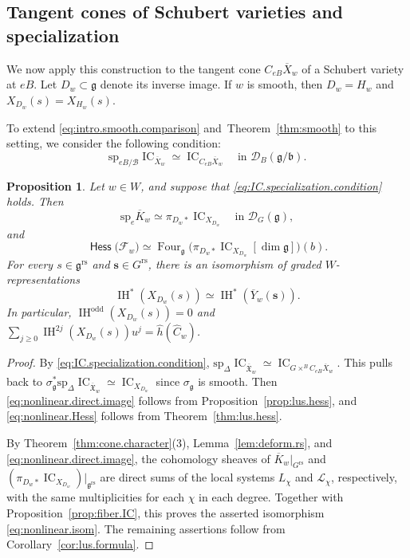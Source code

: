 \documentclass[11pt]{amsart}
\numberwithin{equation}{section}
\newtheorem{proposition}[theorem]{Proposition}
\theoremstyle{definition}
\newcommand\grs{\mathfrak{g}^{\mathrm{rs}}}
\def\beq{\begin{equation}}
\def\eeq{\end{equation}}
\def\sp{\mathrm{sp}}
\DeclareMathOperator{\IC}{\mathrm{IC}}
\DeclareMathOperator{\Four}{Four}
\def\cB{\mathcal {B}}
\DeclareMathOperator{\Hess}{\mathsf{Hess}}
\def\fg{\mathfrak {g}}
\def\fb{\mathfrak {b}}
\def\fX{\mathfrak {X}}
\def\Grs{G^{\mathrm{rs}}}
\DeclareMathOperator{\IH}{\mathrm{IH}}
\begin{document}
\subsection{Tangent cones of Schubert varieties and specialization}
\label{ss:nonlinear.specialization}

We now apply this construction to the tangent cone $C_{eB}\overline X_w$ of a Schubert variety at $eB$. Let $D_w\subset \fg $ denote its inverse image. If $w$ is smooth, then $D_w=H_w$ and $X_{D_w}(s)=X_{H_w}(s)$.

To extend \eqref{eq:intro.smooth.comparison} and~Theorem~\ref{thm:smooth} to this setting, we consider the following condition:
\begin{equation}\tag{SP}\label{eq:IC.specialization.condition}
\sp_{eB/\cB}\IC_{\overline X_w}\simeq\IC_{C_{eB}\overline X_w}
\quad\text{in }\mathscr D_B(\fg/\fb).
\end{equation}


\begin{proposition}\label{prop:nonlinear.specialization}
Let $w\in W$, and suppose that \eqref{eq:IC.specialization.condition} holds. Then
\beq\label{eq:nonlinear.direct.image}
\sp_e\overline K_w\simeq \pi_{D_w*}\IC_{X_{D_w}}\quad\text{in }\mathscr D_G(\fg),
\eeq
and
\beq\label{eq:nonlinear.Hess}
\Hess\big(\mathcal F_w\big)\simeq\Four_\fg\big(\pi_{D_w*}\IC_{X_{D_w}}[\dim \fg]\big)(b).
\eeq
For every $s\in\grs$ and $\mathbf s\in\Grs$, there is
an isomorphism of graded $W$-representations
\beq\label{eq:nonlinear.isom}
\IH^*(X_{D_w}(s))\simeq\IH^*(\overline Y_w(\mathbf s)).
\eeq
In particular,
$\IH^{\mathrm{odd}}(X_{D_w}(s))=0$ and
$\sum_{j\geq0}\IH^{2j}(X_{D_w}(s))u^j
=\widehat h(\widehat C_w)$.
\end{proposition}

\begin{proof}
By \eqref{eq:IC.specialization.condition}, $\sp_\Delta\IC_{\overline{\fX}_w}\simeq\IC_{G\times^BC_{eB}\overline X_w}$.
This pulls back to %
$\sigma_\fg^*\sp_\Delta\IC_{\overline{\fX}_w} \simeq\IC_{X_{D_w}}$ since $\sigma_\fg$ is smooth.
Then \eqref{eq:nonlinear.direct.image} follows from Proposition~\ref{prop:lus.hess}, and \eqref{eq:nonlinear.Hess} follows from Theorem~\ref{thm:lus.hess}.

By Theorem~\ref{thm:cone.character}(3), Lemma~\ref{lem:deform.rs}, and \eqref{eq:nonlinear.direct.image}, the cohomology sheaves of $\overline K_w|_{\Grs}$ and $(\pi_{D_w*}\IC_{X_{D_w}})|_{\grs}$ are direct sums of the local systems $L_\chi$ and $\mathcal L_\chi$, respectively, with the same multiplicities for each $\chi$ in each degree.
Together with Proposition~\ref{prop:fiber.IC}, this proves the asserted isomorphism \eqref{eq:nonlinear.isom}.
The remaining assertions follow from Corollary~\ref{cor:lus.formula}.
\end{proof}
\end{document}

